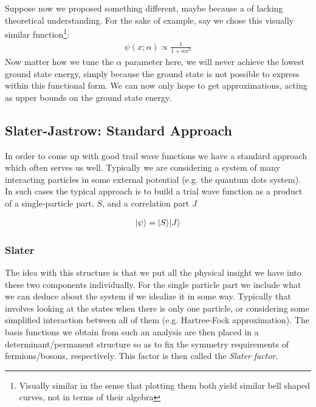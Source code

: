 \documentclass[Thesis.tex]{subfiles}
\begin{document}
Suppose now we proposed something different, maybe because a of lacking theoretical
understanding. For the sake of example, say we chose this visually similar
function\footnote{Visually similar in the sense that plotting them both yield similar bell
shaped curves, not in terms of their algebra}:
\begin{align}
    \psi(x; \alpha)\propto \frac{1}{1 + \alpha x^2}
\end{align}
Now matter how we tune the $\alpha$ parameter here, we will never achieve the lowest
ground state energy, simply because the ground state is not possible to express within this
functional form. We can now only hope to get approximations, acting as upper bounds on the
ground state energy.

\subsection{Slater-Jastrow: Standard Approach}

In order to come up with good trail wave functions we have a standard approach which often
serves us well. Typically we are considering a system of many interacting particles in
some external potential (e.g. the quantum dots system). In such cases the typical approach
is to build a trial wave function as a product of a single-particle part, $S$, and a correlation
part $J$

\begin{align}
    | \psi \rangle = | S \rangle | J \rangle
\end{align}

\subsubsection*{Slater}

The idea with this structure is that we put all the physical insight we have into these
two components individually. For the single particle part we include what we can deduce
about the system if we idealize it in some way. Typically that involves looking at the
states when there is only one particle, or considering some simplified interaction between
all of them (e.g. Hartree-Fock approximation). The basis functions we obtain from such an
analysis are then placed in a determinant/permanent structure so as to fix the symmetry
requirements of fermions/bosons, respectively. This factor is then called the \emph{Slater
factor}.
\end{document}
